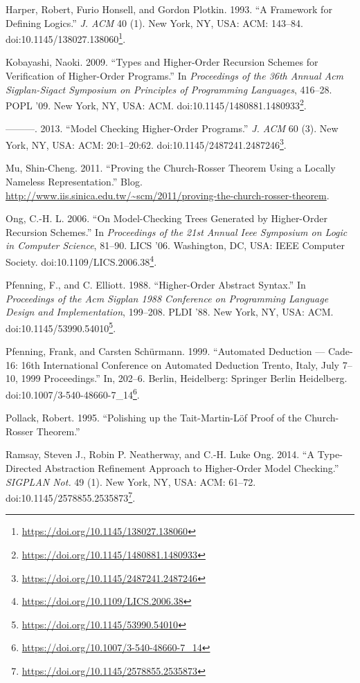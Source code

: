 \documentclass[a4paper, 12pt, twoside]{style/ociamthesis}
\theoremstyle{plain}
\theoremstyle{definition}
\theoremstyle{remark}
\renewcommand{\href}[2]{#2\footnote{\url{#1}}}
\begin{document}
\hypertarget{ref-harper93}{}
Harper, Robert, Furio Honsell, and Gordon Plotkin. 1993. ``A Framework
for Defining Logics.'' \emph{J. ACM} 40 (1). New York, NY, USA: ACM:
143--84.
doi:\href{https://doi.org/10.1145/138027.138060}{10.1145/138027.138060}.

\hypertarget{ref-kobayashi09}{}
Kobayashi, Naoki. 2009. ``Types and Higher-Order Recursion Schemes for
Verification of Higher-Order Programs.'' In \emph{Proceedings of the
36th Annual Acm Sigplan-Sigact Symposium on Principles of Programming
Languages}, 416--28. POPL '09. New York, NY, USA: ACM.
doi:\href{https://doi.org/10.1145/1480881.1480933}{10.1145/1480881.1480933}.

\hypertarget{ref-kobayashi13}{}
---------. 2013. ``Model Checking Higher-Order Programs.'' \emph{J. ACM}
60 (3). New York, NY, USA: ACM: 20:1--20:62.
doi:\href{https://doi.org/10.1145/2487241.2487246}{10.1145/2487241.2487246}.

\hypertarget{ref-shing-cheng}{}
Mu, Shin-Cheng. 2011. ``Proving the Church-Rosser Theorem Using a
Locally Nameless Representation.'' Blog.
\url{http://www.iis.sinica.edu.tw/~scm/2011/proving-the-church-rosser-theorem}.

\hypertarget{ref-ong06}{}
Ong, C.-H. L. 2006. ``On Model-Checking Trees Generated by Higher-Order
Recursion Schemes.'' In \emph{Proceedings of the 21st Annual Ieee
Symposium on Logic in Computer Science}, 81--90. LICS '06. Washington,
DC, USA: IEEE Computer Society.
doi:\href{https://doi.org/10.1109/LICS.2006.38}{10.1109/LICS.2006.38}.

\hypertarget{ref-pfenning88}{}
Pfenning, F., and C. Elliott. 1988. ``Higher-Order Abstract Syntax.'' In
\emph{Proceedings of the Acm Sigplan 1988 Conference on Programming
Language Design and Implementation}, 199--208. PLDI '88. New York, NY,
USA: ACM.
doi:\href{https://doi.org/10.1145/53990.54010}{10.1145/53990.54010}.

\hypertarget{ref-pfenning99}{}
Pfenning, Frank, and Carsten Schürmann. 1999. ``Automated Deduction ---
Cade-16: 16th International Conference on Automated Deduction Trento,
Italy, July 7--10, 1999 Proceedings.'' In, 202--6. Berlin, Heidelberg:
Springer Berlin Heidelberg.
doi:\href{https://doi.org/10.1007/3-540-48660-7_14}{10.1007/3-540-48660-7\_14}.

\hypertarget{ref-pollack95}{}
Pollack, Robert. 1995. ``Polishing up the Tait-Martin-Löf Proof of the
Church-Rosser Theorem.''

\hypertarget{ref-ramsay14}{}
Ramsay, Steven J., Robin P. Neatherway, and C.-H. Luke Ong. 2014. ``A
Type-Directed Abstraction Refinement Approach to Higher-Order Model
Checking.'' \emph{SIGPLAN Not.} 49 (1). New York, NY, USA: ACM: 61--72.
doi:\href{https://doi.org/10.1145/2578855.2535873}{10.1145/2578855.2535873}.
\end{document}
